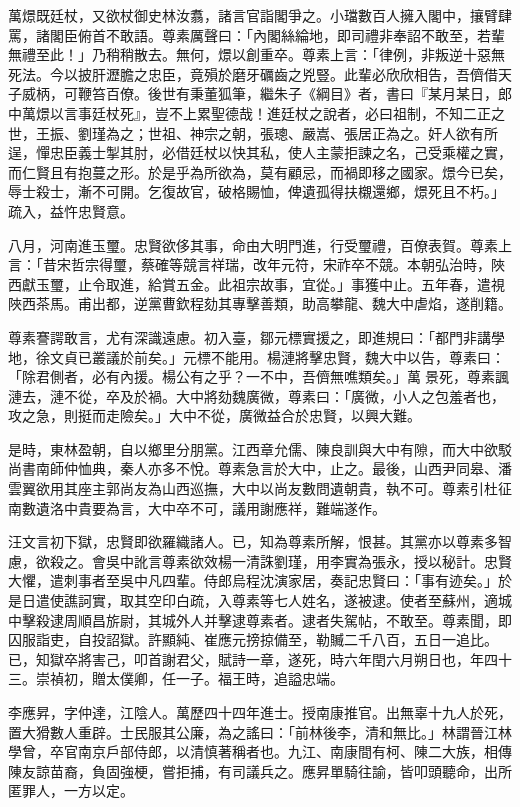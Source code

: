 \begin{pinyinscope}
萬燝既廷杖，又欲杖御史林汝翥，諸言官詣閣爭之。小璫數百人擁入閣中，攘臂肆罵，諸閣臣俯首不敢語。尊素厲聲曰：「內閣絲綸地，即司禮非奉詔不敢至，若輩無禮至此！」乃稍稍散去。無何，燝以創重卒。尊素上言：「律例，非叛逆十惡無死法。今以披肝瀝膽之忠臣，竟殞於磨牙礪齒之兇豎。此輩必欣欣相告，吾儕借天子威柄，可鞭笞百僚。後世有秉董狐筆，繼朱子《綱目》者，書曰『某月某日，郎中萬燝以言事廷杖死』，豈不上累聖德哉！進廷杖之說者，必曰祖制，不知二正之世，王振、劉瑾為之；世祖、神宗之朝，張璁、嚴嵩、張居正為之。奸人欲有所逞，憚忠臣義士掣其肘，必借廷杖以快其私，使人主蒙拒諫之名，己受乘權之實，而仁賢且有抱蔓之形。於是乎為所欲為，莫有顧忌，而禍即移之國家。燝今已矣，辱士殺士，漸不可開。乞復故官，破格賜恤，俾遺孤得扶櫬還鄉，燝死且不朽。」疏入，益忤忠賢意。

八月，河南進玉璽。忠賢欲侈其事，命由大明門進，行受璽禮，百僚表賀。尊素上言：「昔宋哲宗得璽，蔡確等競言祥瑞，改年元符，宋祚卒不競。本朝弘治時，陜西獻玉璽，止令取進，給賞五金。此祖宗故事，宜從。」事獲中止。五年春，遣視陜西茶馬。甫出都，逆黨曹欽程劾其專擊善類，助高攀龍、魏大中虐焰，遂削籍。

尊素謇諤敢言，尤有深識遠慮。初入臺，鄒元標實援之，即進規曰：「都門非講學地，徐文貞已叢議於前矣。」元標不能用。楊漣將擊忠賢，魏大中以告，尊素曰：「除君側者，必有內援。楊公有之乎？一不中，吾儕無噍類矣。」萬景死，尊素諷漣去，漣不從，卒及於禍。大中將劾魏廣微，尊素曰：「廣微，小人之包羞者也，攻之急，則挺而走險矣。」大中不從，廣微益合於忠賢，以興大難。

是時，東林盈朝，自以鄉里分朋黨。江西章允儒、陳良訓與大中有隙，而大中欲駁尚書南師仲恤典，秦人亦多不悅。尊素急言於大中，止之。最後，山西尹同皋、潘雲翼欲用其座主郭尚友為山西巡撫，大中以尚友數問遺朝貴，執不可。尊素引杜征南數遺洛中貴要為言，大中卒不可，議用謝應祥，難端遂作。

汪文言初下獄，忠賢即欲羅織諸人。已，知為尊素所解，恨甚。其黨亦以尊素多智慮，欲殺之。會吳中訛言尊素欲效楊一清誅劉瑾，用李實為張永，授以秘計。忠賢大懼，遣刺事者至吳中凡四輩。侍郎烏程沈演家居，奏記忠賢曰：「事有迹矣。」於是日遣使譙訶實，取其空印白疏，入尊素等七人姓名，遂被逮。使者至蘇州，適城中擊殺逮周順昌旂尉，其城外人并擊逮尊素者。逮者失駕帖，不敢至。尊素聞，即囚服詣吏，自投詔獄。許顯純、崔應元搒掠備至，勒贓二千八百，五日一追比。已，知獄卒將害己，叩首謝君父，賦詩一章，遂死，時六年閏六月朔日也，年四十三。崇禎初，贈太僕卿，任一子。福王時，追謚忠端。

李應昇，字仲達，江陰人。萬歷四十四年進士。授南康推官。出無辜十九人於死，置大猾數人重辟。士民服其公廉，為之謠曰：「前林後李，清和無比。」林謂晉江林學曾，卒官南京戶部侍郎，以清慎著稱者也。九江、南康間有柯、陳二大族，相傳陳友諒苗裔，負固強梗，嘗拒捕，有司議兵之。應昇單騎往諭，皆叩頭聽命，出所匿罪人，一方以定。


\end{pinyinscope}
